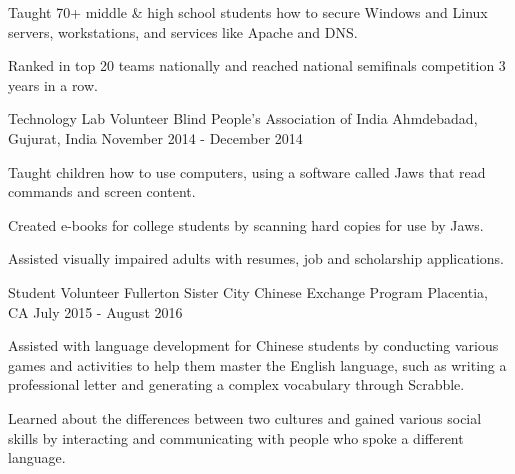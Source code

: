 \begin{cventries}
{\begin{cvitems}
        \item {Taught 70+ middle \& high school students how to secure Windows and Linux servers, workstations, and services like Apache and DNS.}
        \item {Ranked in top 20 teams nationally and reached national semifinals competition 3 years in a row.}
      \end{cvitems}
    }
  \cventry
    {Technology Lab Volunteer} %
    {Blind People's Association of India} %
    {Ahmdebadad, Gujurat, India} %
    {November 2014 - December 2014} %
    {
      \begin{cvitems} %
        \item {Taught children how to use computers, using a software called Jaws that read commands and screen content.}
        \item {Created e-books for college students by scanning hard copies for use by Jaws.}
        \item {Assisted visually impaired adults with resumes, job and scholarship applications.}
      \end{cvitems}
    }
 \cventry
   {Student Volunteer} %
   {Fullerton Sister City Chinese Exchange Program} %
   {Placentia, CA} %
   {July 2015 - August 2016} %
   {
     \begin{cvitems} %
       \item {Assisted with language development for Chinese students by conducting various games and activities to help them master the English language, such as writing a professional letter and generating a complex vocabulary through Scrabble.}
       \item {Learned about the differences between two cultures and gained various social skills by interacting and communicating with people who spoke a different language.}
     \end{cvitems}
   }
\end{cventries}
